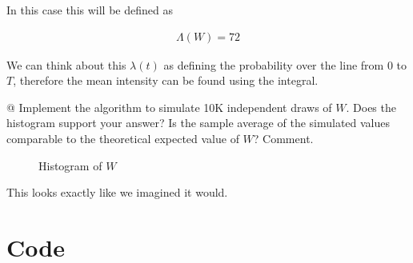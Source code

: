 \documentclass[10pt]{article}
\begin{document}
\begin{easylist}[enumerate]
    In this case this will be defined as

    \begin{align*}
        \Lambda(W) = 72
    \end{align*}

    We can think about this $\lambda(t)$ as defining the probability over the
    line from $0$ to $T$, therefore the mean intensity can be found using the
    integral.

    @ Implement the algorithm to simulate 10K independent draws of $W$. Does the
    histogram support your answer? Is the sample average of the simulated values
    comparable to the theoretical expected value of $W$? Comment.

    \begin{figure}[H]
        \centering
        \caption{Histogram of $W$}
    \end{figure}

    This looks exactly like we imagined it would.
\end{easylist}

\newpage
\appendix
\section{Code}\label{app:code}

\inputminted{python}{lab2.py}
\end{document}
